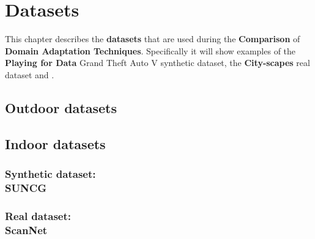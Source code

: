 \chapter{Datasets}
\label{sec:datasets}

This chapter describes the \textbf{datasets} that are used during the \textbf{Comparison} of \textbf{Domain Adaptation Techniques}. Specifically it will show examples of the \textbf{Playing for Data} Grand Theft Auto V synthetic dataset, the \textbf{City-scapes} real dataset and .


\section{Outdoor datasets}



\section{Indoor datasets}

\subsection{Synthetic dataset:\\
	 SUNCG}

\subsection{Real dataset:\\
	 ScanNet}